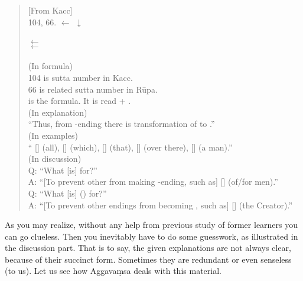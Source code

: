 \begin{quote}
[From Kacc] \\
104, 66.  $\leftarrow$  \hspace{11mm}$\downarrow$\  \\
 \\
 $\leftarrow$  \\
 $\leftarrow$  \\
 \\[2mm]
(In formula) \\
104 is sutta number in Kacc. \\
66 is related sutta number in R\=upa. \\
 is the formula. It is read  + . \\[1.5mm]
(In explanation) \\
``Thus, from -ending there is transformation of  to .'' \\[1.5mm]
(In examples) \\
`` [] (all),  [] (which),  [] (that),  [] (over there),  [] (a man).'' \\[1.5mm]
(In discussion) \\
Q: ``What [is]  for?'' \\
A: ``[To prevent other  from making -ending, such as]  [] (of/for men).'' \\
Q: ``What [is]  () for?'' \\
A: ``[To prevent other endings from becoming , such as]  [] (the Creator).'' \\
\end{quote}

As you may realize, without any help from previous study of former learners you can go clueless. Then you inevitably have to do some guesswork, as illustrated in the discussion part. That is to say, the given explanations are not always clear, because of their succinct form. Sometimes they are redundant or even senseless (to us). Let us see how Aggava\d msa deals with this material.

